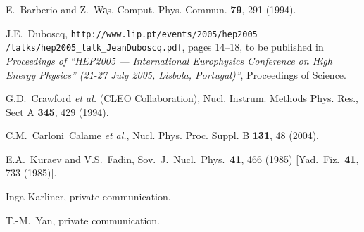 \documentclass{cornell}
\begin{document}
\begin{thebibliography}{99}
E.~Barberio and Z.~W\c{a}s, Comput. Phys. Commun. {\bf 79}, 291 (1994).

J.E.~Duboscq, {\tt http://www.lip.pt/events/2005/hep2005 /talks/hep2005\_talk\_JeanDuboscq.pdf},
pages 14--18, to be published in {\sl Proceedings of ``HEP2005 ---
International Europhysics Conference on High Energy Physics'' (21-27
July 2005, Lisbola, Portugal)''}, Proceedings of Science.

G.D.~Crawford {\it et al.} (CLEO Collaboration),
Nucl. Instrum. Methods Phys. Res., Sect A {\bf 345}, 429 (1994).

C.M.~Carloni~Calame {\sl et al.},
Nucl. Phys. Proc. Suppl. B {\bf 131}, 48 (2004).

E.A.~Kuraev and V.S.~Fadin,
Sov.\ J.\ Nucl.\ Phys.\  {\bf 41}, 466 (1985)
[Yad.\ Fiz.\  {\bf 41}, 733 (1985)].

Inga Karliner, private communication.

T.-M.~Yan, private communication.

\end{thebibliography}
\end{document}
